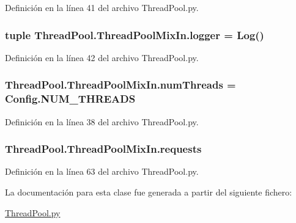 Definición en la línea 41 del archivo Thread\-Pool.\-py.

\hypertarget{class_thread_pool_1_1_thread_pool_mix_in_ad8942e9f9352de2747eda5ecbc00c047}{
\subsubsection[{logger}]{\setlength{\rightskip}{0pt plus 5cm}tuple Thread\-Pool.\-Thread\-Pool\-Mix\-In.\-logger = {\bf Log}()\hspace{0.3cm}{\ttfamily [static]}}}\label{class_thread_pool_1_1_thread_pool_mix_in_ad8942e9f9352de2747eda5ecbc00c047}


Definición en la línea 42 del archivo Thread\-Pool.\-py.

\hypertarget{class_thread_pool_1_1_thread_pool_mix_in_adc4a62f954256f803da312f6e26ee254}{
\subsubsection[{num\-Threads}]{\setlength{\rightskip}{0pt plus 5cm}Thread\-Pool.\-Thread\-Pool\-Mix\-In.\-num\-Threads = {\bf Config.\-N\-U\-M\-\_\-\-T\-H\-R\-E\-A\-D\-S}\hspace{0.3cm}{\ttfamily [static]}}}\label{class_thread_pool_1_1_thread_pool_mix_in_adc4a62f954256f803da312f6e26ee254}


Definición en la línea 38 del archivo Thread\-Pool.\-py.

\hypertarget{class_thread_pool_1_1_thread_pool_mix_in_a93c8c7dd5f32ba5faa17096ea56070ad}{
\subsubsection[{requests}]{\setlength{\rightskip}{0pt plus 5cm}Thread\-Pool.\-Thread\-Pool\-Mix\-In.\-requests}}\label{class_thread_pool_1_1_thread_pool_mix_in_a93c8c7dd5f32ba5faa17096ea56070ad}


Definición en la línea 63 del archivo Thread\-Pool.\-py.



La documentación para esta clase fue generada a partir del siguiente fichero\-:\begin{DoxyCompactItemize}
\item 
\hyperlink{_thread_pool_8py}{Thread\-Pool.\-py}\end{DoxyCompactItemize}
